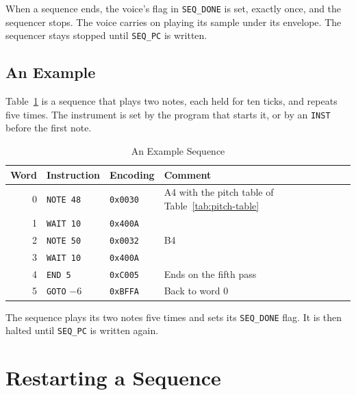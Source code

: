 When a sequence ends, the voice's flag in \texttt{SEQ\_DONE} is set, exactly once, and the sequencer stops. The voice
carries on playing its sample under its envelope. The sequencer stays stopped until \texttt{SEQ\_PC} is written.

\subsection{An Example}

Table~\ref{tab:seq-example} is a sequence that plays two notes, each held for ten ticks, and repeats five times. The
instrument is set by the program that starts it, or by an \texttt{INST} before the first note.

\begin{table}[H]
	\centering
	\begin{tabular}{rlll}
		\toprule
		\textbf{Word} & \textbf{Instruction} & \textbf{Encoding} & \textbf{Comment}                                       \\
		\midrule
		0             & \texttt{NOTE 48}     & \texttt{0x0030}   & A4 with the pitch table of Table~\ref{tab:pitch-table} \\
		1             & \texttt{WAIT 10}     & \texttt{0x400A}   &                                                        \\
		2             & \texttt{NOTE 50}     & \texttt{0x0032}   & B4                                                     \\
		3             & \texttt{WAIT 10}     & \texttt{0x400A}   &                                                        \\
		4             & \texttt{END 5}       & \texttt{0xC005}   & Ends on the fifth pass                                 \\
		5             & \texttt{GOTO} $-6$   & \texttt{0xBFFA}   & Back to word 0                                         \\
		\bottomrule
	\end{tabular}
	\caption{An Example Sequence}
	\label{tab:seq-example}
\end{table}

The sequence plays its two notes five times and sets its \texttt{SEQ\_DONE} flag. It is then halted until
\texttt{SEQ\_PC} is written again.

\section{Restarting a Sequence}
\label{sec:seq-restart}


